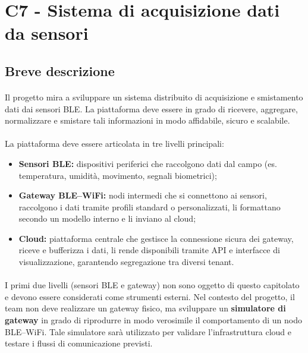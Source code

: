 \documentclass[a4paper,11pt]{article}
\begin{document}
\section{C7 - Sistema di acquisizione dati da sensori}
\subsection{Breve descrizione}
\paragraph{} 
Il progetto mira a sviluppare un sistema distribuito di acquisizione e smistamento dati dai sensori BLE. 
La piattaforma deve essere in grado di ricevere, aggregare, normalizzare e smistare tali informazioni in modo affidabile, sicuro e scalabile.

\paragraph{} 
La piattaforma deve essere articolata in tre livelli principali:

\begin{itemize}
  \item \textbf{Sensori BLE:} dispositivi periferici che raccolgono dati dal campo (es. temperatura, umidità, movimento, segnali biometrici);
  \item \textbf{Gateway BLE--WiFi:} nodi intermedi che si connettono ai sensori, raccolgono i dati tramite profili standard o personalizzati, 
  li formattano secondo un modello interno e li inviano al cloud;
  \item \textbf{Cloud:} piattaforma centrale che gestisce la connessione sicura dei gateway, riceve e bufferizza i dati, 
  li rende disponibili tramite API e interfacce di visualizzazione, garantendo segregazione tra diversi tenant.
\end{itemize}

\paragraph{} 
I primi due livelli (sensori BLE e gateway) non sono oggetto di questo capitolato e devono essere considerati come strumenti esterni. 
Nel contesto del progetto, il team non deve realizzare un gateway fisico, ma sviluppare un \textbf{simulatore di gateway} 
in grado di riprodurre in modo verosimile il comportamento di un nodo BLE--WiFi. 
Tale simulatore sarà utilizzato per validare l'infrastruttura cloud e testare i flussi di comunicazione previsti.
\end{document}
